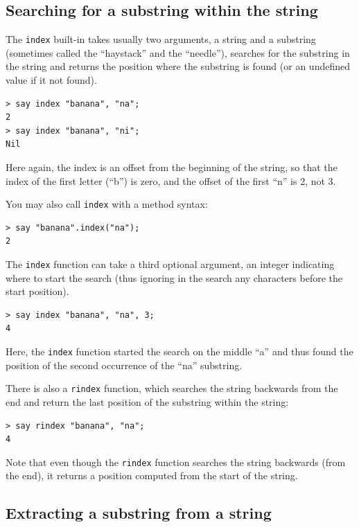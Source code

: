 \subsection{Searching for a substring within the string}

\label{find}

The {\tt index} built-in takes usually two arguments, a string 
and a substring (sometimes called the ``haystack'' and 
the ``needle''), 
searches for the substring in the string and returns the position 
where the substring is found (or an undefined value if it not
found). 

\begin{verbatim}
> say index "banana", "na";
2
> say index "banana", "ni";
Nil
\end{verbatim}
%

Here again, the index is an offset from the beginning of the 
string, so that the index of the first letter (``b'') is zero, 
and the offset of the first ``n'' is 2, not 3.

You may also call {\tt index} with a method syntax:
\begin{verbatim}
> say "banana".index("na");
2
\end{verbatim}
%

The {\tt index} function can take a third optional argument, an integer indicating where to start the search (thus ignoring 
in the search any characters before the start position).

\begin{verbatim}
> say index "banana", "na", 3;
4
\end{verbatim}
%
Here, the {\tt index} function started the search on the middle ``a'' and thus found the position of the second occurrence of 
the ``na'' substring.

There is also a {\tt rindex} function, which searches the string 
backwards from the end and return the last position of the 
substring within the string:

\begin{verbatim}
> say rindex "banana", "na";
4
\end{verbatim}
%

Note that even though the {\tt rindex} function searches the 
string backwards (from the end), it returns a position 
computed from the start of the string.

\subsection{Extracting a substring from a string}

